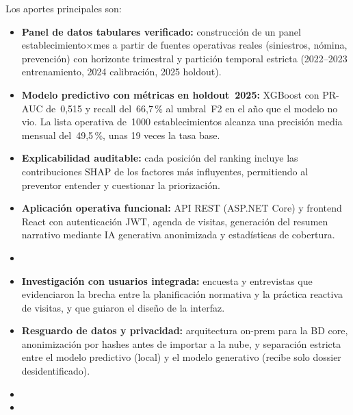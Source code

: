 Los aportes principales son:
\begin{itemize}
	\item \textbf{Panel de datos tabulares verificado:} construcci\'on de un panel establecimiento$\times$mes a partir de fuentes operativas reales (siniestros, n\'omina, prevenci\'on) con horizonte trimestral y partici\'on temporal estricta (2022--2023 entrenamiento, 2024 calibraci\'on, 2025 holdout).
	\item \textbf{Modelo predictivo con m\'etricas en holdout~2025:} XGBoost con PR-AUC de~0,515 y recall del~66,7\,\% al umbral~F2 en el a\~no que el modelo no vio.
	La lista operativa de~1000 establecimientos alcanza una precisi\'on media mensual del~49,5\,\%, unas 19 veces la tasa base.
	\item \textbf{Explicabilidad auditable:} cada posici\'on del ranking incluye las contribuciones SHAP de los factores m\'as influyentes, permitiendo al preventor entender y cuestionar la priorizaci\'on.
	\item \textbf{Aplicaci\'on operativa funcional:} API REST (ASP.NET Core) y frontend React con autenticaci\'on JWT, agenda de visitas, generaci\'on del resumen narrativo mediante IA generativa anonimizada y estad\'isticas de cobertura.
	\item {}
	\item \textbf{Investigaci\'on con usuarios integrada:} encuesta y entrevistas que evidenciaron la brecha entre la planificaci\'on normativa y la pr\'actica reactiva de visitas, y que guiaron el dise\~no de la interfaz.
	\item \textbf{Resguardo de datos y privacidad:} arquitectura on-prem para la BD core, anonimizaci\'on por hashes antes de importar a la nube, y separaci\'on estricta entre el modelo predictivo (local) y el modelo generativo (recibe solo dossier desidentificado).
	\item {}
	\item {}
\end{itemize}

